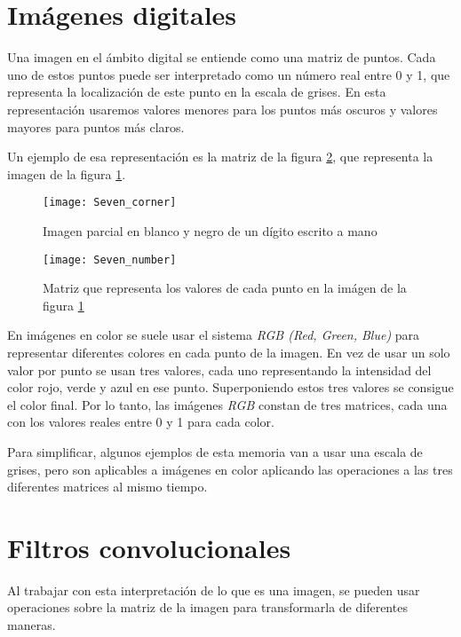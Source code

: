 \section{Imágenes digitales}

Una imagen en el ámbito digital se entiende como una matriz de puntos.
Cada uno de estos puntos puede ser interpretado como un número real entre 0 y 1, que representa la localización de este punto en la escala de grises. En esta representación usaremos valores menores para los puntos más oscuros y valores mayores para puntos más claros.

Un ejemplo de esa representación es la matriz de la figura \ref{Seven_number}, que representa la imagen de la figura \ref{Seven_corner}.

\begin{figure}
    \centering
    \caption{Imagen parcial en blanco y negro de un dígito escrito a mano}
  \label{Seven_corner}
  \texttt{[image: Seven\_corner]}
\end{figure}

\begin{figure}
    \centering
    \caption{Matriz que representa los valores de cada punto en la imágen de la figura \ref{Seven_corner}}
  \label{Seven_number}
  \texttt{[image: Seven\_number]}
\end{figure}


En imágenes en color se suele usar el sistema \textit{RGB (Red, Green, Blue)} para representar diferentes colores en cada punto de la imagen. En vez de usar un solo valor por punto se usan tres valores, cada uno representando la intensidad del color rojo, verde y azul en ese punto. Superponiendo estos tres valores se consigue el color final. Por lo tanto, las imágenes \textit{RGB} constan de tres matrices, cada una con los valores reales entre 0 y 1 para cada color.

Para simplificar, algunos ejemplos de esta memoria van a usar una escala de grises, pero son aplicables a imágenes en color aplicando las operaciones a las tres diferentes matrices al mismo tiempo.

\section{Filtros convolucionales}

Al trabajar con esta interpretación de lo que es una imagen, se pueden usar operaciones sobre la matriz de la imagen para transformarla de diferentes maneras.

